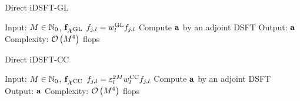 \begin{algorithm}[t]
  \caption{Direct iDSFT-GL}
  \label{NFSFT:directIDSFTGL}    
  \begin{algorithmic}
    \STATE Input: $M \in \mathbb{N}_{0}$, $\mathbf{f}_{\mathcal{X}^{\mbox{\scriptsize\rm{GL}}}}$
    \STATE
        \STATE $f_{j,l} = w^{\mbox{\scriptsize\rm{GL}}}_{l} f_{j,l}$ 
      \ENDFOR
    \ENDFOR
    \STATE Compute $\mathbf{a}$ by an adjoint DSFT
    \STATE
    \STATE Output: $\mathbf{a}$
    \STATE Complexity: $\mathcal{O}\left(M^4\right)$ flops
  \end{algorithmic}
\end{algorithm}
\begin{algorithm}[t]
  \caption{Direct iDSFT-CC}
  \label{NFSFT:directIDSFTCC}    
  \begin{algorithmic}
    \STATE Input: $M \in \mathbb{N}_{0}$, $\mathbf{f}_{\mathcal{X}^{\mbox{\scriptsize\rm{CC}}}}$
    \STATE
        \STATE $f_{j,l} = \varepsilon_{l}^{2M} w^{\mbox{\scriptsize\rm{CC}}}_{l} f_{j,l}$ 
      \ENDFOR
    \ENDFOR
    \STATE Compute $\mathbf{a}$ by an adjoint DSFT
    \STATE
    \STATE Output: $\mathbf{a}$
    \STATE Complexity: $\mathcal{O}\left(M^4\right)$ flops
  \end{algorithmic}
\end{algorithm}





